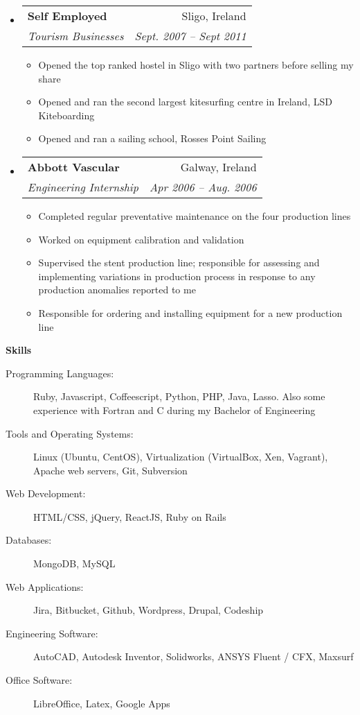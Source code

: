 \documentclass[letterpaper,11pt]{article}
\makeatletter
\newcommand{\resitem}[1]{\item #1 \vspace{-2pt}}
\newcommand{\resheading}[1]{{\large \colorbox{mygrey}{\begin{minipage}{\textwidth}{\textbf{#1 \vphantom{p\^{E}}}}\end{minipage}}}}
\newcommand{\ressubheading}[4]{
\begin{tabular*}{6.5in}{l@{\extracolsep{\fill}}r}
		\textbf{#1} & #2 \\
		\textit{#3} & \textit{#4} \\
\end{tabular*}\vspace{-6pt}}
\makeatother
\begin{document}
\begin{itemize}
      \item 
      \ressubheading{Self Employed}{Sligo, Ireland}{Tourism Businesses}{Sept. 2007 -- Sept 2011}
        { \footnotesize
        \begin{itemize}
         \resitem{Opened the top ranked hostel in Sligo with two partners before selling my share}
        \resitem{Opened and ran the second largest kitesurfing centre in Ireland, LSD Kiteboarding}
        \resitem{Opened and ran a sailing school, Rosses Point Sailing}
        \end{itemize}
        }
        
          \item 
      \ressubheading{Abbott Vascular}{Galway, Ireland}{Engineering Internship}{Apr 2006 -- Aug. 2006}
      { \footnotesize
      \begin{itemize}
      \resitem{Completed regular preventative maintenance on the four production lines}
      \resitem{Worked on equipment calibration and validation}
      \resitem{Supervised the stent production line; responsible for assessing and implementing variations in production process in response to any production anomalies reported to me}
      \resitem{Responsible for ordering and installing equipment for a new production line}
      \end{itemize}
      }

  \end{itemize}  %

\resheading{Skills}
  \begin{description}
    \item[Programming Languages:] { \footnotesize Ruby, Javascript, Coffeescript, Python, PHP, Java, Lasso. 
    Also some experience with Fortran and C during my Bachelor of Engineering}
    \item[Tools and Operating Systems:] { \footnotesize Linux (Ubuntu, CentOS), Virtualization (VirtualBox, Xen, Vagrant), Apache web servers, Git, Subversion
    }
    \item[Web Development:] {\footnotesize HTML/CSS, jQuery, ReactJS, Ruby on Rails }
    \item[Databases:] {\footnotesize MongoDB, MySQL}
    \item[Web Applications:] {\footnotesize Jira, Bitbucket, Github, Wordpress, Drupal, Codeship}
    \item[Engineering Software:]{\footnotesize AutoCAD, Autodesk Inventor, Solidworks, ANSYS Fluent / CFX, Maxsurf}
    \item[Office Software:]{\footnotesize LibreOffice, Latex, Google Apps} 

  \end{description} %
\end{document}
